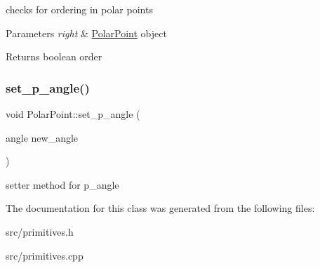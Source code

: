 checks for ordering in polar points 
\begin{DoxyParams}{Parameters}
{\em right} & \hyperlink{classPolarPoint}{Polar\+Point} object \\
\hline
\end{DoxyParams}
\begin{DoxyReturn}{Returns}
boolean order 
\end{DoxyReturn}
\mbox{\label{classPolarPoint_ac63f2017507c73c4bd3c5f89994627ef}} 
\subsubsection{\texorpdfstring{set\+\_\+p\+\_\+angle()}{set\_p\_angle()}}
{\footnotesize\ttfamily void Polar\+Point\+::set\+\_\+p\+\_\+angle (\begin{DoxyParamCaption}\item[{angle}]{new\+\_\+angle }\end{DoxyParamCaption})}

setter method for p\+\_\+angle 

The documentation for this class was generated from the following files\+:\begin{DoxyCompactItemize}
\item 
src/primitives.\+h\item 
src/primitives.\+cpp\end{DoxyCompactItemize}
